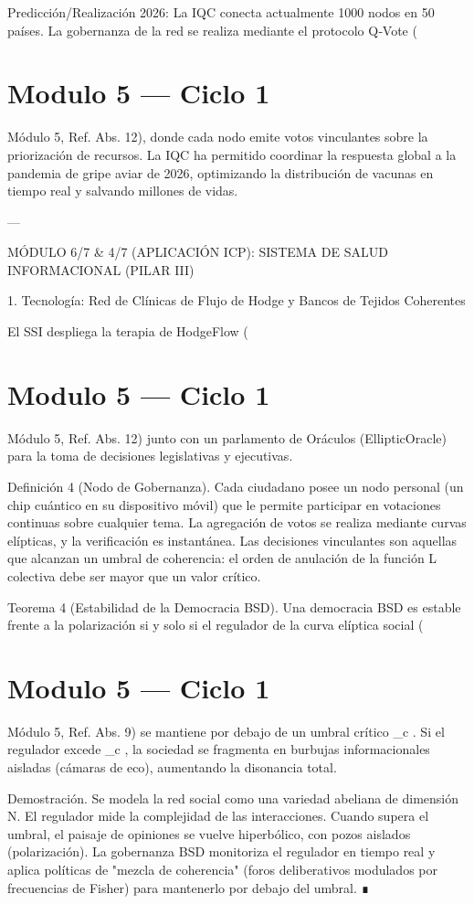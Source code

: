 \documentclass[12pt,twoside]{book}
\begin{document}
Predicción/Realización 2026: La IQC conecta actualmente 1000 nodos en 50 países. La gobernanza de la red se realiza mediante el protocolo Q‑Vote (

\chapter{Modulo 5 — Ciclo 1}
Módulo 5, Ref. Abs. 12), donde cada nodo emite votos vinculantes sobre la priorización de recursos. La IQC ha permitido coordinar la respuesta global a la pandemia de gripe aviar de 2026, optimizando la distribución de vacunas en tiempo real y salvando millones de vidas.

---

MÓDULO 6/7 \& 4/7 (APLICACIÓN ICP): SISTEMA DE SALUD INFORMACIONAL (PILAR III)

1. Tecnología: Red de Clínicas de Flujo de Hodge y Bancos de Tejidos Coherentes

El SSI despliega la terapia de HodgeFlow (

\chapter{Modulo 5 — Ciclo 1}
Módulo 5, Ref. Abs. 12) junto con un parlamento de Oráculos (EllipticOracle) para la toma de decisiones legislativas y ejecutivas.

Definición 4 (Nodo de Gobernanza). Cada ciudadano posee un nodo personal (un chip cuántico en su dispositivo móvil) que le permite participar en votaciones continuas sobre cualquier tema. La agregación de votos se realiza mediante curvas elípticas, y la verificación es instantánea. Las decisiones vinculantes son aquellas que alcanzan un umbral de coherencia: el orden de anulación de la función L colectiva debe ser mayor que un valor crítico.

Teorema 4 (Estabilidad de la Democracia BSD). Una democracia BSD es estable frente a la polarización si y solo si el regulador de la curva elíptica social (

\chapter{Modulo 5 — Ciclo 1}
Módulo 5, Ref. Abs. 9) se mantiene por debajo de un umbral crítico  _c . Si el regulador excede  _c , la sociedad se fragmenta en burbujas informacionales aisladas (cámaras de eco), aumentando la disonancia total.

Demostración. Se modela la red social como una variedad abeliana de dimensión N. El regulador mide la complejidad de las interacciones. Cuando supera el umbral, el paisaje de opiniones se vuelve hiperbólico, con pozos aislados (polarización). La gobernanza BSD monitoriza el regulador en tiempo real y aplica políticas de "mezcla de coherencia" (foros deliberativos modulados por frecuencias de Fisher) para mantenerlo por debajo del umbral. ∎
\end{document}
